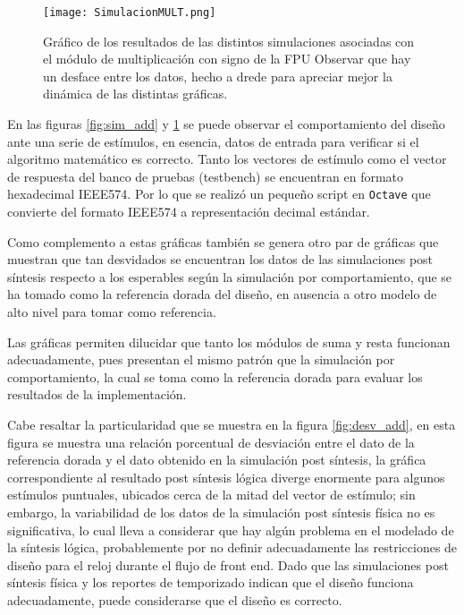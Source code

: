 \begin{figure}[h]
\texttt{[image: SimulacionMULT.png]}
\centering
\caption{Gráfico de los resultados de las distintos simulaciones asociadas con el módulo de multiplicación con signo de la FPU Observar que hay un desface entre los datos, hecho a drede para apreciar mejor la dinámica de las distintas gráficas.}
\label{fig:sim_mult}
\end{figure}

En las figuras \ref{fig:sim_add} y \ref{fig:sim_mult} se puede observar el comportamiento del diseño ante una serie de estímulos, en esencia, datos de entrada para verificar si el algoritmo matemático es correcto. Tanto los vectores de estímulo como el vector de respuesta del banco de pruebas (testbench) se encuentran en formato hexadecimal IEEE574. Por lo que se realizó un pequeño script en \texttt{Octave} que convierte del formato IEEE574 a representación decimal estándar.

Como complemento a estas gráficas también se genera otro par de gráficas que muestran que tan desvidados se encuentran los datos de las simulaciones post síntesis respecto a los esperables según la simulación por comportamiento, que se ha tomado como la referencia dorada del diseño, en ausencia a otro modelo de alto nivel para tomar como referencia.

Las gráficas permiten dilucidar que tanto los módulos de suma y resta funcionan adecuadamente, pues presentan el mismo patrón que la simulación por comportamiento, la cual se toma como la referencia dorada para evaluar los resultados de la implementación. 

Cabe resaltar la particularidad que se muestra en la figura \ref{fig:desv_add}, en esta figura se muestra una relación porcentual de desviación entre el dato de la referencia dorada y el dato obtenido en la simulación post síntesis, la gráfica correspondiente al resultado post síntesis lógica diverge enormente para algunos estímulos puntuales, ubicados cerca de la mitad del vector de estímulo; sin embargo, la variabilidad de los datos de la simulación post síntesis física no es significativa, lo cual lleva a considerar que hay algún problema en el modelado de la síntesis lógica, probablemente por no definir adecuadamente las restricciones de diseño para el reloj durante el flujo de front end. Dado que las simulaciones post síntesis física y los reportes de temporizado indican que el diseño funciona adecuadamente, puede considerarse que el diseño es correcto.

